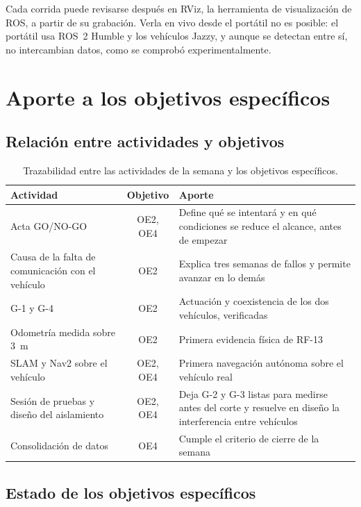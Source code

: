 \documentclass[12pt,letterpaper]{article}
\begin{document}
Cada corrida puede revisarse después en RViz, la herramienta de visualización de ROS, a partir de su grabación. Verla en vivo desde el portátil no es posible: el portátil usa ROS~2 Humble y los vehículos Jazzy, y aunque se detectan entre sí, no intercambian datos, como se comprobó experimentalmente.

\section{Aporte a los objetivos específicos}
\label{sec:aporte}

\subsection{Relación entre actividades y objetivos}

\begin{table}[H]
    \centering
    \small
    \caption{Trazabilidad entre las actividades de la semana y los objetivos específicos.}
    \label{tab:trazabilidad}
    \begin{tabular}{@{}p{4.8cm}cp{7.0cm}@{}}
        \toprule
        \textbf{Actividad} & \textbf{Objetivo} & \textbf{Aporte} \\ \midrule
        Acta GO/NO-GO & OE2, OE4 & Define qué se intentará y en qué condiciones se reduce el alcance, antes de empezar \\ \addlinespace
        Causa de la falta de comunicación con el vehículo & OE2 & Explica tres semanas de fallos y permite avanzar en lo demás \\ \addlinespace
        G-1 y G-4 & OE2 & Actuación y coexistencia de los dos vehículos, verificadas \\ \addlinespace
        Odometría medida sobre 3~m & OE2 & Primera evidencia física de RF-13 \\ \addlinespace
        SLAM y Nav2 sobre el vehículo & OE2, OE4 & Primera navegación autónoma sobre el vehículo real \\ \addlinespace
        Sesión de pruebas y diseño del aislamiento & OE2, OE4 & Deja G-2 y G-3 listas para medirse antes del corte y resuelve en diseño la interferencia entre vehículos \\ \addlinespace
        Consolidación de datos & OE4 & Cumple el criterio de cierre de la semana \\ \bottomrule
    \end{tabular}
\end{table}

\subsection{Estado de los objetivos específicos}
\end{document}
